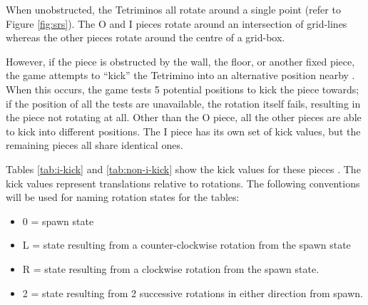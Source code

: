 \documentclass[a4paper, 12pt]{extreport}
\begin{document}
				When unobstructed, the Tetriminos all rotate around a single point (refer to Figure \ref{fig:srs}). The O and I pieces rotate around an intersection of grid-lines whereas the other pieces rotate around the centre of a grid-box.
								
				However, if the piece is obstructed by the wall, the floor, or another fixed piece, the game attempts to ``kick'' the Tetrimino into an alternative position nearby \cite{harddrop}. When this occurs, the game tests 5 potential positions to kick the piece towards; if the position of all the tests are unavailable, the rotation itself fails, resulting in the piece not rotating at all. Other than the O piece, all the other pieces are able to kick into different positions. The I piece has its own set of kick values, but the remaining pieces all share identical ones.
				
				Tables \ref{tab:i-kick} and \ref{tab:non-i-kick} show the kick values for these pieces \cite{harddrop}. The kick values represent translations relative to rotations. The following conventions will be used for naming rotation states for the tables:
				
				\begin{itemize}
					\item 0 = spawn state
					\item L = state resulting from a counter-clockwise rotation from the spawn state
					\item R = state resulting from a clockwise rotation from the spawn state.
					\item 2 = state resulting from 2 successive rotations in either direction from spawn.
				\end{itemize}
				
\end{document}
